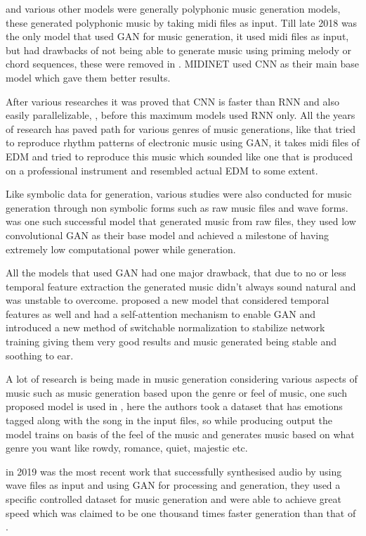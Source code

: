\documentclass[oneside,12pt]{Classes/RoboticsLaTeX}
\begin{document}
\cite{polygan} and various other models were generally polyphonic music generation models, these generated polyphonic music by taking midi files as input. Till late 2018 \cite{crnngan} was the only model that used GAN for music generation, it used midi files as input, but had drawbacks of not being able to generate music using priming melody or chord sequences, these were removed in \cite{midinet}. MIDINET used CNN as their main base model which gave them better results.

After various researches it was proved that CNN is faster than RNN and also easily parallelizable, \cite{pxlcnn}, before this maximum models used RNN only. All the years of research has paved path for various genres of music generations, like \cite{edm} that tried to reproduce rhythm patterns of electronic music using GAN, it takes midi files of EDM and tried to reproduce this music which sounded like one that is produced on a professional instrument and resembled actual EDM to some extent.

Like symbolic data for generation, various studies were also conducted for music generation through non symbolic forms such as raw music files and wave forms. \cite{mp3net} was one such successful model that generated music from raw files, they used low convolutional GAN as their base model and achieved a milestone of having extremely low computational power while generation.

All the models that used GAN had one major drawback, that due to no or less temporal feature extraction the generated music didn't always sound natural and was unstable to overcome. \cite{dmbgan} proposed a new model that considered temporal features as well and had a self-attention mechanism to enable GAN and introduced a new method of switchable normalization to stabilize network training giving them very good results and music generated being stable and soothing to ear.

A lot of research is being made in music generation considering various aspects of music such as music generation based upon the genre or feel of music, one such proposed model is used in \cite{cvaegan}, here the authors took a dataset that has emotions tagged along with the song in the input files, so while producing output the model trains on basis of the feel of the music and generates music based on what genre you want like rowdy, romance, quiet, majestic etc.

\cite{gansynth} in 2019 was the most recent work that successfully synthesised audio by using wave files as input and using GAN for processing and generation, they used a specific controlled dataset for music generation and were able to achieve great speed which was claimed to be one thousand times faster generation than that of  \cite{wavenet}.
\end{document}
